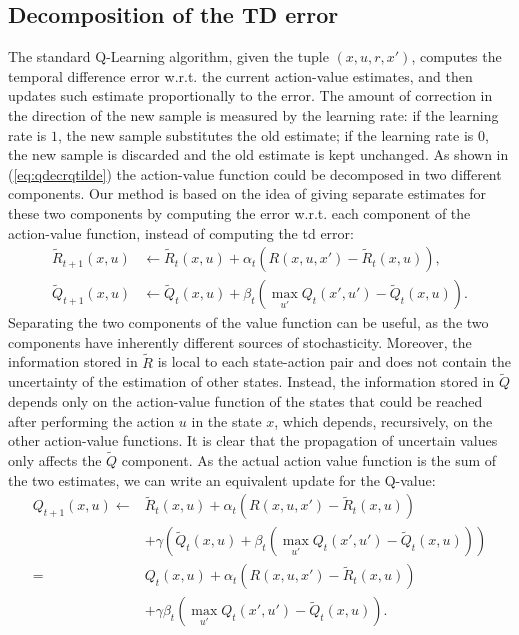 \subsection{Decomposition of the TD error}
The standard Q-Learning algorithm, given the tuple $(x,u,r,x')$, computes the temporal difference error w.r.t. the current action-value estimates, and then updates such estimate proportionally to the error. The amount of correction in the direction of the new sample is measured by the learning rate: if the learning rate is $1$, the new sample substitutes the old estimate; if the learning rate is $0$, the new sample is discarded and the old estimate is kept unchanged. 
As shown in (\ref{eq:qdecrqtilde}) the action-value function could be decomposed in two different components. Our method is based on the idea of giving separate estimates for these two components by computing the error w.r.t. each component of the action-value function, instead of computing the \gls{td} error:
\begin{align}
\tilde{R}_{t+1}(x,u) & \leftarrow\tilde{R}_t(x,u)+\alpha_t(R(x,u,x')-\tilde{R}_t(x,u)), \label{eq:rtilupdedate}\\
\tilde{Q}_{t+1}(x,u) & \leftarrow\tilde{Q}_t(x,u)+\beta_t(\max_{u'}Q_t(x',u')-\tilde{Q}_t(x,u)).
\label{eq:qtildeupdate}
\end{align}
Separating the two components of the value function can be useful, as the two components have inherently different sources of stochasticity. Moreover, the information stored in $\tilde{R}$ is local to each state-action pair and does not contain the uncertainty of the estimation of other states. Instead, the information stored in $\tilde{Q}$ depends only on the action-value function of the states that could be reached after performing the action $u$ in the state $x$, which depends, recursively, on the other action-value functions. It is clear that the propagation of uncertain values only affects the $\tilde{Q}$ component.
As the actual action value function is the sum of the two estimates, we can write an equivalent update for the Q-value:
\begin{align}
Q_{t+1}(x,u)\leftarrow&\tilde{R}_t(x,u)+\alpha_t(R(x,u,x')-\tilde{R}_t(x,u)) \nonumber\\
  & +\gamma\left(\tilde{Q}_t(x,u)+\beta_t(\max_{u'}Q_t(x',u')-\tilde{Q}_t(x,u))\right) \nonumber\\
= & Q_t(x,u)+\alpha_t(R(x,u,x')-\tilde{R}_t(x,u)) \nonumber\\
  & +\gamma\beta_t(\max_{u'}Q_t(x',u')-\tilde{Q}_t(x,u)).
 \label{eq:cumulativeupdate}
\end{align}

